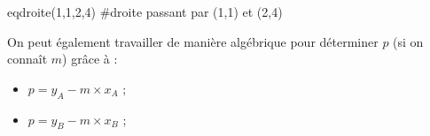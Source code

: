 \documentclass[a4paper,11pt]{article}
\begin{document}
\begin{cillustr}
\begin{calgo}
\begin{consolepython}[15cm]
\begin{pyconsole}[][framesep=3mm,frame=single,label={[\scriptsize Début de la console \logopython]\scriptsize Fin de la console \logopython},fontsize=\footnotesize,framerule=1pt,rulecolor=\color{ForestGreen}]
eqdroite(1,1,2,4) #droite passant par (1,1) et (2,4)
\end{pyconsole}
\end{consolepython}
\end{calgo}
%
%
%		
%		
%		
\end{cillustr}

\begin{crmq}
On peut également travailler de manière algébrique pour déterminer $p$ (si on connaît $m$) grâce à :
\begin{itemize}
	\item $p=y_A-m \times x_A$ ;
	\item $p=y_B-m \times x_B$ ;
\end{itemize}
\end{crmq}
\end{document}
